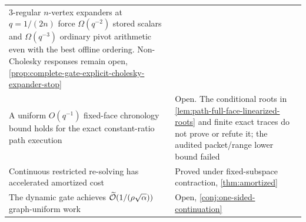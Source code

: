 \begin{center}
\begin{tabularx}{\textwidth}{@{}X p{}@{}}
$3$-regular $n$-vertex expanders at $q=1/(2n)$ force $\Omega(q^{-2})$ stored scalars and
$\Omega(q^{-3})$ ordinary pivot arithmetic even with the best offline
ordering.  Non-Cholesky responses remain open,
\cref{prop:complete-gate-explicit-cholesky-expander-stop} \\
A uniform $O(q^{-1})$ fixed-face chronology bound holds for the exact
constant-ratio path execution & Open.  The conditional roots in
\cref{lem:path-full-face-linearized-roots} and finite exact traces do not
prove or refute it; the audited packet/range lower bound failed \\
Continuous restricted re-solving has accelerated amortized cost & Proved
under fixed-subspace contraction, \cref{thm:amortized} \\
The dynamic gate achieves
$\widetilde{\mathcal{O}}(1/(\rho\sqrt\alpha))$ graph-uniform work & Open,
\cref{conj:one-sided-continuation} \\
\bottomrule
\end{tabularx}
\end{center}

